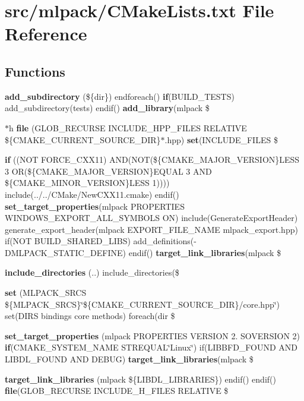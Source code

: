 \section{src/mlpack/\+C\+Make\+Lists.txt File Reference}
\label{CMakeLists_8txt}
\subsection*{Functions}
\begin{DoxyCompactItemize}
\item 
{\bf add\+\_\+subdirectory} (\$\{dir\}) endforeach() {\bf if}(B\+U\+I\+L\+D\+\_\+\+T\+E\+S\+TS) add\+\_\+subdirectory(tests) endif() {\bf add\+\_\+library}(mlpack \$
\item 
$\ast$h {\bf file} (G\+L\+O\+B\+\_\+\+R\+E\+C\+U\+R\+SE I\+N\+C\+L\+U\+D\+E\+\_\+\+H\+P\+P\+\_\+\+F\+I\+L\+ES R\+E\+L\+A\+T\+I\+VE \$\{C\+M\+A\+K\+E\+\_\+\+C\+U\+R\+R\+E\+N\+T\+\_\+\+S\+O\+U\+R\+C\+E\+\_\+\+D\+IR\}$\ast$.hpp) {\bf set}(I\+N\+C\+L\+U\+D\+E\+\_\+\+F\+I\+L\+ES \$
\item 
{\bf if} ((N\+OT F\+O\+R\+C\+E\+\_\+\+C\+X\+X11) A\+ND(N\+OT(\$\{C\+M\+A\+K\+E\+\_\+\+M\+A\+J\+O\+R\+\_\+\+V\+E\+R\+S\+I\+ON\}L\+E\+SS 3 OR(\$\{C\+M\+A\+K\+E\+\_\+\+M\+A\+J\+O\+R\+\_\+\+V\+E\+R\+S\+I\+ON\}E\+Q\+U\+AL 3 A\+ND \$\{C\+M\+A\+K\+E\+\_\+\+M\+I\+N\+O\+R\+\_\+\+V\+E\+R\+S\+I\+ON\}L\+E\+SS 1)))) include(../../C\+Make/New\+C\+X\+X11.\+cmake) endif() {\bf set\+\_\+target\+\_\+properties}(mlpack P\+R\+O\+P\+E\+R\+T\+I\+ES W\+I\+N\+D\+O\+W\+S\+\_\+\+E\+X\+P\+O\+R\+T\+\_\+\+A\+L\+L\+\_\+\+S\+Y\+M\+B\+O\+LS ON) include(Generate\+Export\+Header) generate\+\_\+export\+\_\+header(mlpack E\+X\+P\+O\+R\+T\+\_\+\+F\+I\+L\+E\+\_\+\+N\+A\+ME mlpack\+\_\+export.\+hpp) if(N\+OT B\+U\+I\+L\+D\+\_\+\+S\+H\+A\+R\+E\+D\+\_\+\+L\+I\+BS) add\+\_\+definitions(-\/D\+M\+L\+P\+A\+C\+K\+\_\+\+S\+T\+A\+T\+I\+C\+\_\+\+D\+E\+F\+I\+NE) endif() {\bf target\+\_\+link\+\_\+libraries}(mlpack \$
\item 
{\bf include\+\_\+directories} (..) include\+\_\+directories(\$
\item 
{\bf set} (M\+L\+P\+A\+C\+K\+\_\+\+S\+R\+CS \$\{M\+L\+P\+A\+C\+K\+\_\+\+S\+R\+CS\}\char`\"{}\$\{C\+M\+A\+K\+E\+\_\+\+C\+U\+R\+R\+E\+N\+T\+\_\+\+S\+O\+U\+R\+C\+E\+\_\+\+D\+IR\}/core.\+hpp\char`\"{}) set(D\+I\+RS bindings core methods) foreach(dir \$
\item 
{\bf set\+\_\+target\+\_\+properties} (mlpack P\+R\+O\+P\+E\+R\+T\+I\+ES V\+E\+R\+S\+I\+ON 2. S\+O\+V\+E\+R\+S\+I\+ON 2) {\bf if}(C\+M\+A\+K\+E\+\_\+\+S\+Y\+S\+T\+E\+M\+\_\+\+N\+A\+ME S\+T\+R\+E\+Q\+U\+AL\char`\"{}Linux\char`\"{}) if(L\+I\+B\+B\+F\+D\+\_\+\+F\+O\+U\+ND A\+ND L\+I\+B\+D\+L\+\_\+\+F\+O\+U\+ND A\+ND D\+E\+B\+UG) {\bf target\+\_\+link\+\_\+libraries}(mlpack \$
\item 
{\bf target\+\_\+link\+\_\+libraries} (mlpack \$\{L\+I\+B\+D\+L\+\_\+\+L\+I\+B\+R\+A\+R\+I\+ES\}) endif() endif() {\bf file}(G\+L\+O\+B\+\_\+\+R\+E\+C\+U\+R\+SE I\+N\+C\+L\+U\+D\+E\+\_\+\+H\+\_\+\+F\+I\+L\+ES R\+E\+L\+A\+T\+I\+VE \$
\end{DoxyCompactItemize}



